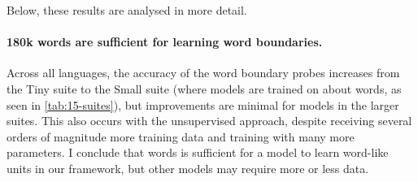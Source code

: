 Below, these results are analysed in more detail.

\paragraph{180k words are sufficient for learning word boundaries.}
Across all languages, the accuracy of the word boundary probes increases from the Tiny suite to the Small suite (where models are trained on about  words, as seen in \cref{tab:15-suites}), but improvements are minimal for models in the larger suites. This also occurs with the unsupervised approach, despite receiving several orders of magnitude more training data and training with many more parameters. I conclude that  words is sufficient for a model to learn word-like units in our framework, but other models may require more or less data. 






